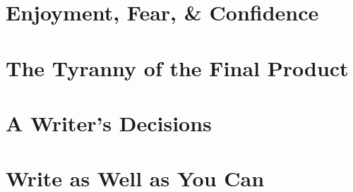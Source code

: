 \documentclass{article}
\begin{document}
\section{Enjoyment, Fear, \& Confidence}


\section{The Tyranny of the Final Product}


\section{A Writer's Decisions}


\section{Write as Well as You Can}


\printbibliography[heading=bibintoc]
\end{document}
